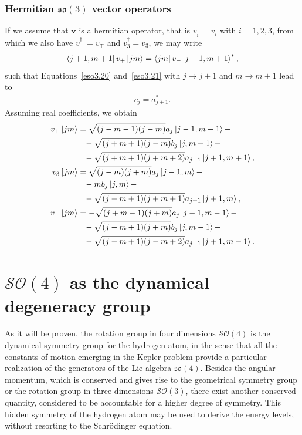 \documentclass[12pt,a4paper]{report}
\theoremstyle{definition}
\theoremstyle{remark}
\theoremstyle{remark}
\begin{document}
\subsection{Hermitian $\mathfrak{so}(3)$ vector operators}
If we assume that $\mathbf{v}$ is a hermitian operator, that is $v_i^\dagger=v_i$ with $i=1,2,3$, from which we also have $v_\pm^\dagger=v_\mp$ and $v_3^\dagger=v_3$, we may write
\begin{align*}
\bra{j+1,m+1}v_+\ket{jm}=\bra{jm}v_-\ket{j+1,m+1}^*,
\end{align*}
such that Equations~\ref{eso3.20} and~\ref{eso3.21} with $j\rightarrow j+1$ and $m\rightarrow m+1$ lead to
\begin{align*}
c_j=a_{j+1}^*.
\end{align*}
Assuming real coefficients, we obtain
\begin{equation}\label{eso3.22}
\begin{aligned}
v_+\ket{jm}&=\sqrt{(j-m-1)(j-m)}a_j\ket{j-1,m+1}-\\
&\phantom{=}-\sqrt{(j+m+1)(j-m)}b_j\ket{j,m+1}-\\
&\phantom{=}-\sqrt{(j+m+1)(j+m+2)}a_{j+1}\ket{j+1,m+1},\\
v_3\ket{jm}&=\sqrt{(j-m)(j+m)}a_j\ket{j-1,m}-\\
&\phantom{=}-mb_j\ket{j,m}-\\
&\phantom{=}-\sqrt{(j-m+1)(j+m+1)}a_{j+1}\ket{j+1,m},\\
v_-\ket{jm}&=-\sqrt{(j+m-1)(j+m)}a_j\ket{j-1,m-1}-\\
&\phantom{=}-\sqrt{(j-m+1)(j+m)}b_j\ket{j,m-1}-\\
&\phantom{=}-\sqrt{(j-m+1)(j-m+2)}a_{j+1}\ket{j+1,m-1}.
\end{aligned}
\end{equation}


\chapter{$\mathcal{SO}(4)$ as the dynamical degeneracy group}
As it will be proven, the rotation group in four dimensions $\mathcal{SO}(4)$ is the dynamical symmetry group for the hydrogen atom, in the sense that all the constants of motion emerging in the Kepler problem provide a particular realization of the generators of the Lie algebra $\mathfrak{so}(4)$. Besides the angular momentum, which is conserved and gives rise to the geometrical symmetry group or the rotation group in three dimensions $\mathcal{SO}(3)$, there exist another conserved quantity, considered to be accountable for a higher degree of symmetry. This hidden symmetry of the hydrogen atom may be used to derive the energy levels, without resorting to the Schrödinger equation.
\end{document}
